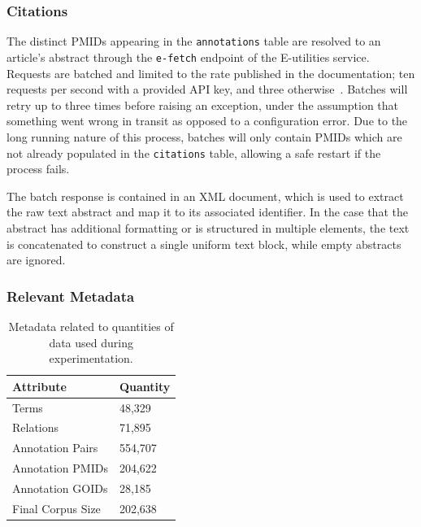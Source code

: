 \documentclass[11pt]{article}
\theoremstyle{plain}
\theoremstyle{definition}
\begin{document}
\subsubsection{Citations}\label{sec:methods-database-citations}

The distinct PMIDs appearing in the \verb|annotations| table are resolved to an article's abstract through the \verb|e-fetch| endpoint of the E-utilities service. Requests are batched and limited to the rate published in the documentation; ten requests per second with a provided API key, and three otherwise~\cite{ncbi/2026/eutilities}. Batches will retry up to three times before raising an exception,  under the assumption that something went wrong in transit as opposed to a configuration error.  Due to the long running nature of this process, batches will only contain PMIDs which are not already populated in the \verb|citations| table, allowing a safe restart if the process fails.

The batch response is contained in an XML document, which is used to extract the raw text abstract and map it to its associated identifier. In the case that the abstract has additional formatting or is structured in multiple elements, the text is concatenated to construct a single uniform text block, while empty abstracts are ignored.

\subsubsection{Relevant Metadata}\label{sec:methods-database-metadata}

\begin{table}
    \centering
    \begin{tabular}{|m{10em}|m{5em}|}
        \hline
        Attribute         & Quantity \\
        \hline
        \hline
        Terms             & 48,329   \\
        \hline
        Relations         & 71,895   \\
        \hline
        Annotation Pairs  & 554,707  \\
        \hline
        Annotation PMIDs  & 204,622  \\
        \hline
        Annotation GOIDs  & 28,185   \\
        \hline
        Final Corpus Size & 202,638  \\
        \hline
    \end{tabular}
    \caption{Metadata related to quantities of data used during experimentation. }\label{tab:metadata}
\end{table}
\end{document}
